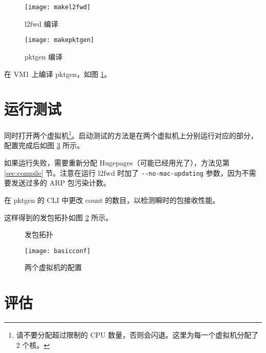 
    \begin{figure}[H]
        \centering
        \begin{minipage}{0.48\textwidth}
            \centering
            \texttt{[image: makel2fwd]}
            \caption{l2fwd 编译}\label{fig:makel2fwd}
        \end{minipage}
        \begin{minipage}{0.48\textwidth}
            \centering
            \texttt{[image: makepktgen]}
            \caption{pktgen 编译}\label{fig:makepktgen}
        \end{minipage}
    \end{figure}

    在 VM1 上编译 pktgen，如图 \ref{fig:makepktgen}。


    \section{运行测试}

    同时打开两个虚拟机\footnote{请不要分配超过限制的 CPU 数量，否则会闪退。这里为每一个虚拟机分配了 2 个核。}。启动测试的方法是在两个虚拟机上分别运行对应的部分\cite{l2fwduse}，配置完成后如图 \ref{fig:basicconf} 所示。

    如果运行失败，需要重新分配 Hugepages（可能已经用光了），方法见第 \ref{sec:compile} 节。注意在运行 l2fwd 时加了 \verb"--no-mac-updating" 参数，因为不需要发送过多的 ARP 包污染计数\cite{dpdkl2}。

    在 pktgen 的 CLI 中更改 count 的数目，以检测瞬时的包接收性能。


    这样得到的发包拓扑如图 \ref{fig:topo} 所示。

    \begin{figure}[H]
        \centering
        
        \caption{发包拓扑}\label{fig:topo}
    \end{figure}

    \begin{figure}[H]
        \centering
        \texttt{[image: basicconf]}
        \caption{两个虚拟机的配置}\label{fig:basicconf}
    \end{figure}

    \section{评估}

